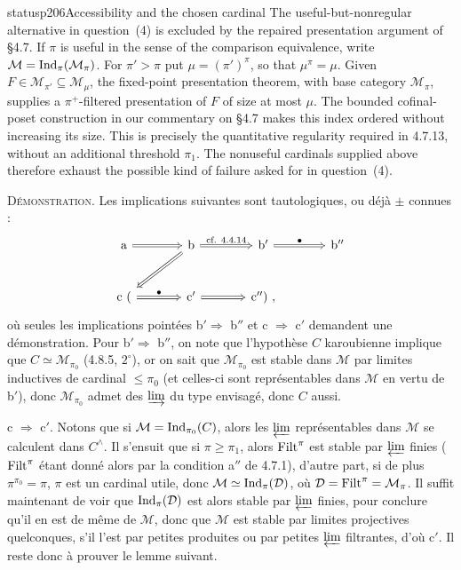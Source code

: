 \begin{dcomment}{status}{p206}{Accessibility and the chosen cardinal}
The useful-but-nonregular alternative in question~(4) is excluded by the repaired presentation argument of \S4.7. If $\pi$ is useful in the sense of the comparison equivalence, write $\mathcal M=\operatorname{Ind}_\pi(\mathcal M_\pi)$. For $\pi'>\pi$ put $\mu=(\pi')^\pi$, so that $\mu^\pi=\mu$. Given $F\in\mathcal M_{\pi'}\subseteq\mathcal M_\mu$, the fixed-point presentation theorem, with base category $\mathcal M_\pi$, supplies a $\pi^+$-filtered presentation of $F$ of size at most $\mu$. The bounded cofinal-poset construction in our commentary on \S4.7 makes this index ordered without increasing its size. This is precisely the quantitative regularity required in 4.7.13, without an additional threshold $\pi_1$. The nonuseful cardinals supplied above therefore exhaust the possible kind of failure asked for in question~(4).
\end{dcomment}


\textsc{Démonstration.} Les implications suivantes sont tautologiques, ou déjà $\pm$ connues :
\[
\begin{tikzcd}[column sep=large, row sep=large]
\mathrm{a} \arrow[r, Rightarrow] & \mathrm{b} \arrow[r, Rightarrow, "\text{cf. 4.4.14}"] \arrow[dl, Rightarrow] & \mathrm{b}' \arrow[r, Rightarrow, "\bullet"] & \mathrm{b}'' \\
\mathrm{c}\ ( \arrow[r, Rightarrow, "\bullet"] & \mathrm{c}' \arrow[r, Rightarrow] & \mathrm{c}'')\ , &
\end{tikzcd}
\]
où seules les implications pointées b$'\Longrightarrow$ b$''$ et c $\Longrightarrow$ c$'$ demandent une démonstration. Pour b$'\Longrightarrow$ b$''$, on note que l'hypothèse $C$ karoubienne implique que $C\simeq\mathcal{M}_{\pi_0}$ (4.8.5, $2^\circ$), or on sait que $\mathcal{M}_{\pi_0}$ est stable dans $\mathcal{M}$ par limites inductives de cardinal $\leqslant\pi_0$ (et celles-ci sont représentables dans $\mathcal{M}$ en vertu de b$'$), donc $\mathcal{M}_{\pi_0}$ admet des $\varinjlim$ du type envisagé, donc $C$ aussi.

c $\Longrightarrow$ c$'$. Notons que si $\mathcal{M}=\operatorname{Ind}_{\pi_0}(C)$, alors les $\varprojlim$ représentables dans $\mathcal{M}$ se calculent dans $C^\wedge$. Il s'ensuit que si $\pi\geqslant\pi_1$, alors $\operatorname{Filt}^\pi$ est stable par $\varprojlim$ finies ($\operatorname{Filt}^\pi$ étant donné alors par la condition a$''$ de 4.7.1), d'autre part, si de plus $\pi^{\pi_0}=\pi$, $\pi$ est un cardinal utile, donc $\mathcal{M}\simeq\operatorname{Ind}_\pi(\mathcal{D})$, où $\mathcal{D}=\operatorname{Filt}^\pi=\mathcal{M}_\pi$. Il suffit maintenant de voir que $\operatorname{Ind}_\pi(\mathcal{D})$ est alors stable par $\varprojlim$ finies, pour conclure qu'il en est de même de $\mathcal{M}$, donc que $\mathcal{M}$ est stable par limites projectives quelconques, s'il l'est par petites produites ou par petites $\varprojlim$ filtrantes, d'où c$'$. Il reste donc à prouver le lemme suivant. %

